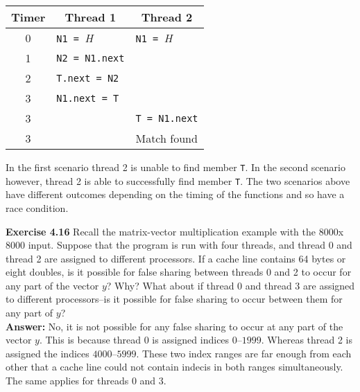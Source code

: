 \documentclass[12pt]{article}
\begin{document}
\begin{enumerate}[label=\alph*.]
    \begin{center}
        \begin{tabular}{| c | l | l |}
            \hline
            \multicolumn{1}{|c|}{Timer} & \multicolumn{1}{|c|}{Thread 1} & \multicolumn{1}{|c|}{Thread 2}\\ \hline
            0     & \texttt{N1 = }\emph{H}      & \texttt{N1 = }\emph{H} \\ \hline
            1     & \texttt{N2 = N1.next}       & \\ \hline
            2     & \texttt{T.next = N2}        & \\ \hline
            3     & \texttt{N1.next = T}        & \\ \hline
            3     &                             & \texttt{T = N1.next} \\ \hline
            3     &                             & Match found \\
            \hline
        \end{tabular}
    \end{center}
    
    In the first scenario thread 2 is unable to find member \texttt{T}. In the second scenario however, thread 2 is able to successfully find member \texttt{T}. The two scenarios above have different outcomes depending on the timing of the functions and so have a race condition.
    
\end{enumerate}

\pagebreak

\textbf{Exercise 4.16} Recall the matrix-vector multiplication example with the $8000$x$8000$ input. Suppose that the program is run with four threads, and thread 0 and thread 2 are assigned to different processors. If a cache line contains 64 bytes or eight doubles, is it possible for false sharing between threads 0 and 2 to occur for any part of the vector $y$? Why? What about if thread 0 and thread 3 are assigned to different processors--is it possible for false sharing to occur between them for any part of $y$?\\[10pt]

\textbf{Answer:} No, it is not possible for any false sharing to occur at any part of the vector $y$. This is because thread $0$ is assigned indices $0$--$1999$. Whereas thread 2 is assigned the indices $4000$--$5999$. These two index ranges are far enough from each other that a cache line could not contain indecis in both ranges simultaneously. The same applies for threads $0$ and $3$.\\[10pt]
\end{document}
